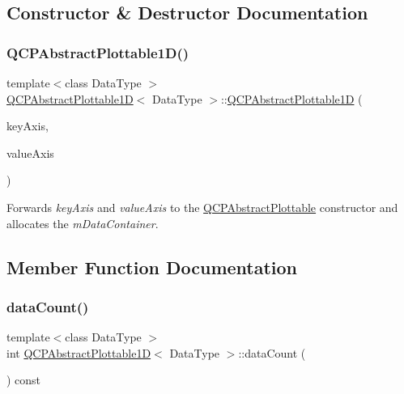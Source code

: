 \subsection{Constructor \& Destructor Documentation}
\mbox{\label{class_q_c_p_abstract_plottable1_d_a30b2e50ab0afce65f104ea7a95440315}} 
\subsubsection{\texorpdfstring{Q\+C\+P\+Abstract\+Plottable1\+D()}{QCPAbstractPlottable1D()}}
{\footnotesize\ttfamily template$<$class Data\+Type $>$ \\
\hyperlink{class_q_c_p_abstract_plottable1_d}{Q\+C\+P\+Abstract\+Plottable1D}$<$ Data\+Type $>$\+::\hyperlink{class_q_c_p_abstract_plottable1_d}{Q\+C\+P\+Abstract\+Plottable1D} (\begin{DoxyParamCaption}\item[{\hyperlink{class_q_c_p_axis}{Q\+C\+P\+Axis} $\ast$}]{key\+Axis,  }\item[{\hyperlink{class_q_c_p_axis}{Q\+C\+P\+Axis} $\ast$}]{value\+Axis }\end{DoxyParamCaption})}

Forwards {\itshape key\+Axis} and {\itshape value\+Axis} to the \hyperlink{class_q_c_p_abstract_plottable_af78a036e40db6f53a31abadc5323715a}{Q\+C\+P\+Abstract\+Plottable} constructor and allocates the {\itshape m\+Data\+Container}. 

\subsection{Member Function Documentation}
\mbox{\label{class_q_c_p_abstract_plottable1_d_a354545da303458283df3f7948a7a768b}} 
\subsubsection{\texorpdfstring{data\+Count()}{dataCount()}\hspace{0.1cm}{\footnotesize\ttfamily [1/2]}}
{\footnotesize\ttfamily template$<$class Data\+Type $>$ \\
int \hyperlink{class_q_c_p_abstract_plottable1_d}{Q\+C\+P\+Abstract\+Plottable1D}$<$ Data\+Type $>$\+::data\+Count (\begin{DoxyParamCaption}{ }\end{DoxyParamCaption}) const\hspace{0.3cm}{\ttfamily [virtual]}}





